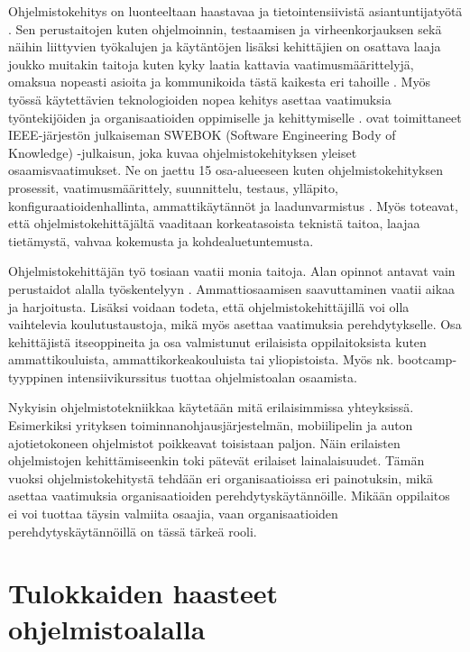 \documentclass[utf8]{gradu3}
\begin{document}
Ohjelmistokehitys on luonteeltaan haastavaa ja tietointensiivistä asiantuntijatyötä \parencite{viana-ym-2014}. Sen perustaitojen kuten ohjelmoinnin, testaamisen ja virheenkorjauksen sekä näihin liittyvien työkalujen ja käytäntöjen lisäksi kehittäjien on osattava laaja joukko muitakin taitoja kuten kyky laatia kattavia vaatimusmäärittelyjä, omaksua nopeasti asioita ja kommunikoida tästä kaikesta eri tahoille %
\parencites%
    {tejera-hernández-ym-2018}%
    {begel-simon-2008-all-over-again}%
\relax.
%
Myös työssä käytettävien teknologioiden nopea kehitys asettaa vaatimuksia työntekijöiden ja organisaatioiden oppimiselle ja kehittymiselle \parencite{tejera-hernández-ym-2018}. \textcite{swebok} ovat toimittaneet IEEE-järjestön julkaiseman SWEBOK (Software Engineering Body of Knowledge) -julkaisun, joka kuvaa ohjelmistokehityksen yleiset osaamisvaatimukset. Ne on jaettu 15 osa-alueeseen kuten ohjelmistokehityksen prosessit, vaatimusmäärittely, suunnittelu, testaus, ylläpito, konfiguraatioidenhallinta, ammattikäytännöt ja laadunvarmistus \parencite{swebok}. Myös \textcite{gregory-ym-2020} toteavat, että ohjelmistokehittäjältä vaaditaan korkeatasoista teknistä taitoa, laajaa tietämystä, vahvaa kokemusta ja kohdealuetuntemusta. 

Ohjelmistokehittäjän työ tosiaan vaatii monia taitoja. Alan opinnot antavat vain perustaidot alalla työskentelyyn \parencite{begel-simon-2008-all-over-again}. Ammattiosaamisen saavuttaminen vaatii aikaa ja harjoitusta. Lisäksi voidaan todeta, että ohjelmistokehittäjillä voi olla vaihtelevia koulutustaustoja, mikä myös asettaa vaatimuksia perehdytykselle. Osa kehittäjistä itseoppineita ja osa valmistunut erilaisista oppilaitoksista kuten ammattikouluista, ammattikorkeakouluista tai yliopistoista. Myös nk. bootcamp-tyyppinen intensiivikurssitus tuottaa ohjelmistoalan osaamista. 

Nykyisin ohjelmistotekniikkaa käytetään mitä erilaisimmissa yhteyksissä. Esimerkiksi yrityksen toiminnanohjausjärjestelmän, mobiilipelin ja auton ajotietokoneen ohjelmistot poikkeavat toisistaan paljon. Näin erilaisten ohjelmistojen kehittämiseenkin toki pätevät erilaiset lainalaisuudet. Tämän vuoksi ohjelmistokehitystä tehdään eri organisaatioissa eri painotuksin, mikä asettaa vaatimuksia organisaatioiden perehdytyskäytännöille. Mikään oppilaitos ei voi tuottaa täysin valmiita osaajia, vaan organisaatioiden perehdytyskäytännöillä on tässä tärkeä rooli.

\section{Tulokkaiden haasteet ohjelmistoalalla}
\label{luku-tulokkaiden-haasteet}
\end{document}
